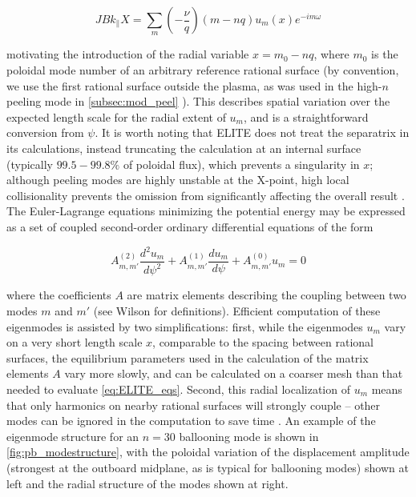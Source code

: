 \begin{equation}\label{eq:ELITE_y}
 JBk_\parallel X = \sum_m \left(-\frac{\nu}{q}\right) \left(m-nq\right) u_m(x)e^{-im\omega}
\end{equation}

\noindent motivating the introduction of the radial variable $x = m_0 - nq$, where $m_0$ is the poloidal mode number of an arbitrary reference rational surface (by convention, we use the first rational surface outside the plasma, as was used in the high-$n$ peeling mode in \cref{subsec:mod_peel} \cite{Wilson2002}).  This describes spatial variation over the expected length scale for the radial extent of $u_m$, and is a straightforward conversion from $\psi$.  It is worth noting that ELITE does not treat the separatrix in its calculations, instead truncating the calculation at an internal surface (typically $99.5-99.8\%$ of poloidal flux), which prevents a singularity in $x$; although peeling modes are highly unstable at the X-point, high local collisionality prevents the omission from significantly affecting the overall result \cite{Snyder2009a}.  The Euler-Lagrange equations minimizing the potential energy may be expressed as a set of coupled second-order ordinary differential equations of the form \cite{Dowsett2014}

\begin{equation}\label{eq:ELITE_eqs}
 A^{(2)}_{m,m'} \frac{d^2 u_m}{d\psi^2} + A^{(1)}_{m,m'} \frac{du_m}{d\psi} + A^{(0)}_{m,m'} u_m = 0
\end{equation}

\noindent where the coefficients $A$ are matrix elements describing the coupling between two modes $m$ and $m'$ (see Wilson \etal \cite{Wilson2002} for definitions).  Efficient computation of these eigenmodes is assisted by two simplifications: first, while the eigenmodes $u_m$ vary on a very short length scale $x$, comparable to the spacing between rational surfaces, the equilibrium parameters used in the calculation of the matrix elements $A$ vary more slowly, and can be calculated on a coarser mesh than that needed to evaluate \cref{eq:ELITE_eqs}.  Second, this radial localization of $u_m$ means that only harmonics on nearby rational surfaces will strongly couple -- other modes can be ignored in the computation to save time \cite{Wilson2002}.  An example of the eigenmode structure for an $n=30$ ballooning mode is shown in \cref{fig:pb_modestructure}, with the poloidal variation of the displacement amplitude (strongest at the outboard midplane, as is typical for ballooning modes) shown at left and the radial structure of the modes shown at right.

